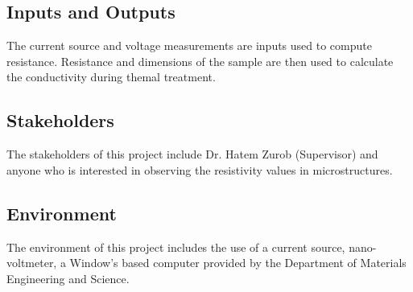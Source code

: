 \documentclass[12pt, titlepage]{article}
\begin{document}
\subsection{Inputs and Outputs}
The current source and voltage measurements are inputs used to compute resistance.
Resistance and dimensions of the sample are then used to calculate the conductivity 
during themal treatment.


\subsection{Stakeholders}
The stakeholders of this project include Dr. Hatem Zurob (Supervisor) and 
anyone who is interested in observing the resistivity values in microstructures.

\subsection{Environment}
The environment of this project includes the use of a current source, nano-voltmeter,
a Window's based computer provided by the Department of Materials Engineering and Science.

\newpage
\end{document}
